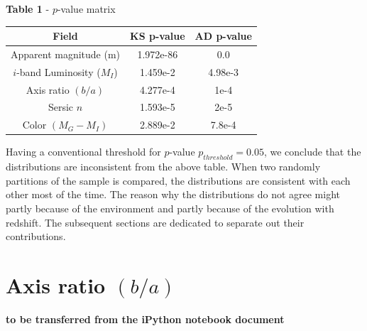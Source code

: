 \documentclass[twocolumn,useAMS,usenatbib]{mn2e}
\newcommand{\mi}{\ensuremath{M_I}}
\newcommand{\sersicn}{Sersic $n$}
\begin{document}
{\bf Table 1 } - $p$-value matrix 
\begin{tabular}{||c|c|c||}
 \hline
  Field & KS p-value & AD p-value \\
 \hline 
  Apparent magnitude (m) & 1.972e-86 & 0.0 \\
  $i$-band Luminosity (\mi) & 1.459e-2 & 4.98e-3 \\
  Axis ratio $(b/a)$ & 4.277e-4 & 1e-4\\
  \sersicn & 1.593e-5 & 2e-5\\
  Color $(M_G-M_I)$ & 2.889e-2 & 7.8e-4\\
  
\end{tabular}

Having a conventional threshold for $p$-value $p_{threshold} = 0.05$, we conclude that the distributions are inconsistent from the above table.
When two randomly partitions of the sample is compared, the distributions are consistent with each other most of the time. The reason why the distributions
do not agree might partly because of the environment and partly because of the evolution with redshift. The subsequent sections are dedicated to separate out
their contributions.



% 

\section{Axis ratio $(b/a)$}


{\bf to be transferred from the iPython notebook document}
\end{document}
